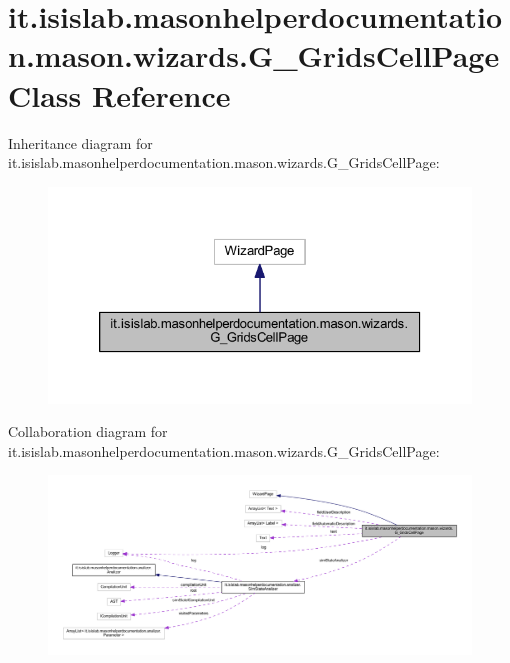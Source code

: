 \hypertarget{classit_1_1isislab_1_1masonhelperdocumentation_1_1mason_1_1wizards_1_1_g___grids_cell_page}{\section{it.\-isislab.\-masonhelperdocumentation.\-mason.\-wizards.\-G\-\_\-\-Grids\-Cell\-Page Class Reference}
\label{classit_1_1isislab_1_1masonhelperdocumentation_1_1mason_1_1wizards_1_1_g___grids_cell_page}
}


Inheritance diagram for it.\-isislab.\-masonhelperdocumentation.\-mason.\-wizards.\-G\-\_\-\-Grids\-Cell\-Page\-:\nopagebreak
\begin{figure}[H]
\begin{center}
\leavevmode
\includegraphics[width=326pt]{classit_1_1isislab_1_1masonhelperdocumentation_1_1mason_1_1wizards_1_1_g___grids_cell_page__inherit__graph}
\end{center}
\end{figure}


Collaboration diagram for it.\-isislab.\-masonhelperdocumentation.\-mason.\-wizards.\-G\-\_\-\-Grids\-Cell\-Page\-:\nopagebreak
\begin{figure}[H]
\begin{center}
\leavevmode
\includegraphics[width=350pt]{classit_1_1isislab_1_1masonhelperdocumentation_1_1mason_1_1wizards_1_1_g___grids_cell_page__coll__graph}
\end{center}
\end{figure}
